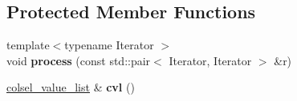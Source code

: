 \subsection*{Protected Member Functions}
\begin{DoxyCompactItemize}
\item 
\hypertarget{classstrtk_1_1details_1_1column__selector__base_a5feb5ff5c548cdb4865d97f012008546}{{\footnotesize template$<$typename Iterator $>$ }\\void {\bfseries process} (const std\-::pair$<$ Iterator, Iterator $>$ \&r)}\label{classstrtk_1_1details_1_1column__selector__base_a5feb5ff5c548cdb4865d97f012008546}

\item 
\hypertarget{classstrtk_1_1details_1_1column__selector__base_ac2647dda1e834ba10cc1a08b4b96d616}{\hyperlink{classstrtk_1_1details_1_1column__selector__base_1_1colsel__value__list}{colsel\-\_\-value\-\_\-list} \& {\bfseries cvl} ()}\label{classstrtk_1_1details_1_1column__selector__base_ac2647dda1e834ba10cc1a08b4b96d616}

\end{DoxyCompactItemize}
